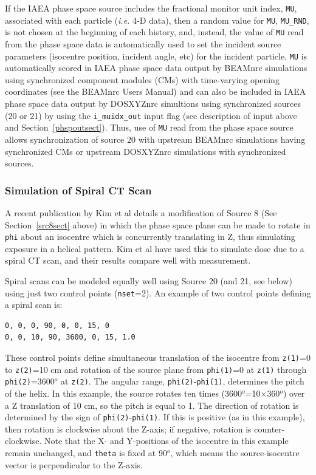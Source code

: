 \documentclass[12pt,twoside]{article}      %
\newcommand{\indexm}[1]{\index{#1}}
\begin{document}
\indexm{MU}
\indexm{MU\_RND}
If the IAEA phase space source includes the fractional monitor unit index, {\tt MU}, associated with each particle ({\it i.e.} 4-D data), then
a random value for {\tt MU}, {\tt MU\_RND}, is not chosen at the beginning of each history, and, instead, the value of
{\tt MU} read from the phase space data is automatically
used to set the incident source parameters (isocentre position, incident angle, etc) for the incident particle.
{\tt MU} is automatically
scored in IAEA phase space data output by BEAMnrc simulations using synchronized component modules (CMs) with time-varying opening coordinates
(see the BEAMnrc Users Manual\cite{Ro09}) and can also be included in IAEA phase space data output by DOSXYZnrc
simultions using synchronized sources (20 or 21) by using the {\tt i\_muidx\_out} input flag
(see description of input above and Section~\ref{phspoutsect}).  Thus, use of {\tt MU} read from
the phase space source allows synchronization of source 20 with upstream BEAMnrc simulations having synchronized
CMs or upstream DOSXYZnrc simulations with synchronized sources.

\indexm{spiral CT scan}
\subsubsection{Simulation of Spiral CT Scan}

A recent publication by Kim et al\cite{Ki13} details a modification of Source 8 (See Section~\ref{src8sect} above)
in which the phase space plane can be made to rotate in {\tt phi} about an isocentre which is concurrently
translating in Z, thus simulating exposure in a helical pattern.  Kim et al have used this to simulate dose due
to a spiral CT scan, and their results compare well with measurement.

Spiral scans can be modeled equally well using Source 20 (and 21, see below) using just two control points ({\tt nset}=2).
An example of two control points defining a spiral scan is:

\begin{verbatim}
0, 0, 0, 90, 0, 0, 15, 0
0, 0, 10, 90, 3600, 0, 15, 1.0
\end{verbatim}

These control points define simultaneous translation of the isocentre from {\tt z(1)}=0 to {\tt z(2)}=10 cm and rotation of the source plane
from {\tt phi(1)}=0 at {\tt z(1)} through {\tt phi(2)}=3600$^o$ at {\tt z(2)}.  The angular range, {\tt phi(2)}-{\tt phi(1)}, determines the
pitch of the helix.  In this example, the source rotates ten times (3600$^o$=10$\times$360$^o$) over a Z translation of 10 cm, so the pitch is
equal to 1.  The direction of rotation is determined by the sign of {\tt phi(2)}-{\tt phi(1)}.
If this is positive (as in this example), then rotation is clockwise about the Z-axis; if negative, rotation is counter-clockwise.  Note that the X- and Y-positions of the isocentre in this example remain unchanged, and {\tt theta} is fixed
at 90$^o$, which means the source-isocentre vector is perpendicular to the Z-axis.
\end{document}
